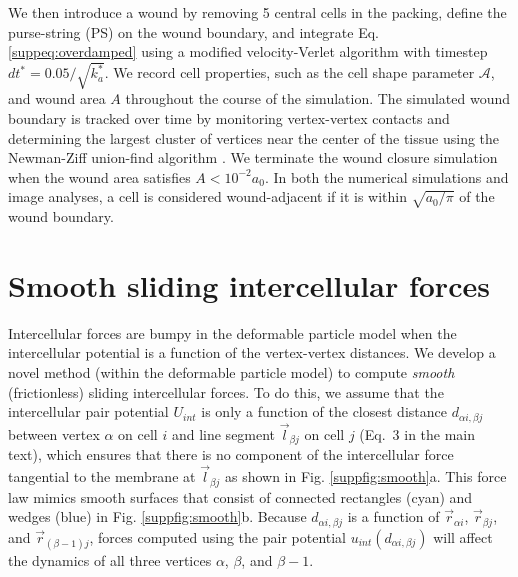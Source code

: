 \documentclass[%
 reprint,
superscriptaddress,
 amsmath,amssymb,
pre,
]{revtex4-2}
\begin{document}
We then introduce a wound by removing 5 central cells in the packing, define the purse-string (PS) on the wound boundary, and integrate Eq. \ref{suppeq:overdamped} using a modified velocity-Verlet algorithm with timestep $dt^* = 0.05/\sqrt{k_a^*}$. We record cell properties, such as the cell shape parameter $\mathcal{A}$, and wound area $A$ throughout the course of the simulation. The simulated wound boundary is tracked over time by monitoring vertex-vertex contacts and determining the largest cluster of vertices near the center of the tissue using the Newman-Ziff union-find algorithm \cite{newman2001fast}. We terminate the wound closure simulation when the wound area satisfies $A < 10^{-2} a_0$. In both the numerical simulations and image analyses, a cell is considered wound-adjacent if it is within $\sqrt{a_0/\pi}$ of the wound boundary.

\section{Smooth sliding intercellular forces}

Intercellular forces are bumpy in the deformable particle model when the intercellular potential is a function of the vertex-vertex distances. We develop a novel method (within the deformable particle model) to compute \textit{smooth} (frictionless) sliding intercellular forces. To do this, we assume that the intercellular pair potential $U_{int}$ is only a function of the closest distance $d_{\alpha i, \beta j}$ between vertex $\alpha$ on cell $i$ and line segment ${\vec l}_{\beta j}$ on cell $j$ (Eq.~3 in the main text), which ensures that there is no component of the intercellular force tangential to the membrane at $\vec{l}_{\beta j}$ as shown in Fig. \ref{suppfig:smooth}a.  This force law mimics smooth surfaces that consist of connected rectangles (cyan) and wedges (blue) in Fig. \ref{suppfig:smooth}b. Because $d_{\alpha i, \beta j}$ is a function of $\vec{r}_{\alpha i}$, $\vec{r}_{\beta j}$, and $\vec{r}_{(\beta-1) j}$, forces computed using the pair potential $u_{int}(d_{\alpha i,\beta j})$ will affect the dynamics of all three vertices $\alpha$, $\beta$, and $\beta-1$.
\end{document}

